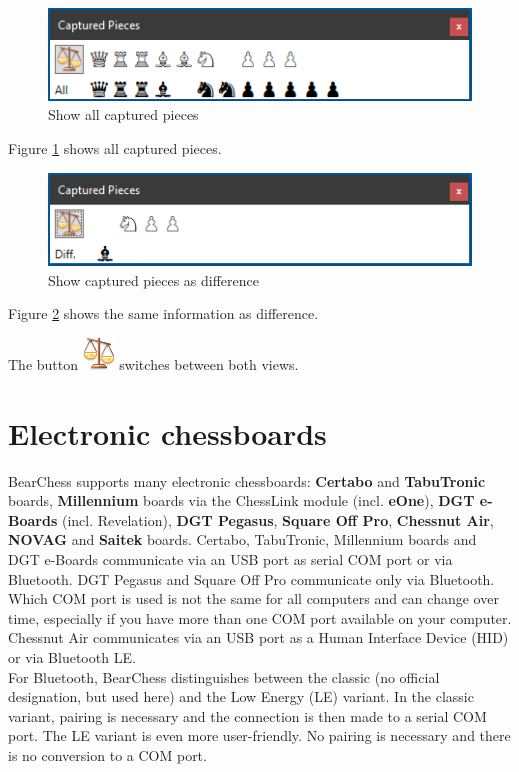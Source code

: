 \documentclass[11pt,a4paper]{article}
\begin{document}
\begin{figure}[H]
	\centering
	\includegraphics[scale=1.0]{CapturedPieces3.png}
	\caption{Show all captured pieces }
	\label{fig:CapturedPieces3}
\end{figure}

Figure \ref{fig:CapturedPieces3} shows all captured pieces.

\begin{figure}[H]
	\centering
	\includegraphics[scale=1.0]{CapturedPieces4.png}
	\caption{Show captured pieces as difference}
	\label{fig:CapturedPieces4}
\end{figure}
Figure \ref{fig:CapturedPieces4} shows the same information as difference.

The button \includegraphics[scale=0.5]{balance_unbalance.png} switches between both views.


\section{Electronic chessboards} \label{ElectronicChessBoard}
BearChess supports many electronic chessboards: \textbf{Certabo} and \textbf{TabuTronic}  boards, \textbf{Millennium} boards via the ChessLink module (incl. \textbf{eOne}), \textbf{DGT e-Boards} (incl. Revelation), \textbf{DGT Pegasus}, \textbf{Square Off Pro}, \textbf{Chessnut Air}, \textbf{NOVAG} and \textbf{Saitek} boards. Certabo, TabuTronic, Millennium boards and DGT e-Boards communicate via an USB port as serial COM port or via Bluetooth. DGT Pegasus and Square Off Pro communicate only via Bluetooth. Which COM port is used is not the same for all computers and can change over time, especially if you have more than one COM port available on your computer. Chessnut Air communicates via an USB port as a Human Interface Device (HID) or via Bluetooth LE.\\ 
For Bluetooth, BearChess distinguishes between the classic (no official designation, but used here) and the Low Energy (LE) variant.
In the classic variant, pairing is necessary and the connection is then made to a serial COM port. The LE variant is even more user-friendly. No pairing is necessary and there is no conversion to a COM port.
\end{document}

